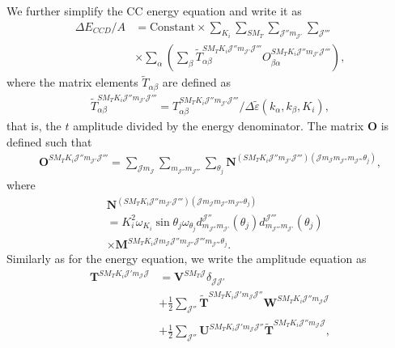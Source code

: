 \documentclass[a4paper,12pt]{report}
\begin{document}
We further simplify the CC energy equation and write it
as
\begin{align} \label{eq:cc_ene_impl2}
  \Delta E_{CCD}/A &= \text{Constant} \times \sum_{K_{i}}
  \sum_{SM_{T}}\sum_{\mathcal{J}''m_{\mathcal{J}'}}
  \sum_{\mathcal{J}'''} \nonumber \\
  & \times \sum_{\alpha } \left( 
  \sum_{\beta }\tilde{T}_{\alpha \beta }^{SM_{T}K_{i}\mathcal{J}''m_{\mathcal{J}'}
    \mathcal{J}'''}O_{\beta \alpha }^{SM_{T}K_{i}\mathcal{J}''
    m_{\mathcal{J}'}\mathcal{J}'''}
  \right),
\end{align}
where the matrix elements $\tilde{T}_{\alpha \beta }$ are defined as
\begin{align}
  \tilde{T}_{\alpha \beta }^{SM_{T}K_{i}\mathcal{J}''m_{\mathcal{J}'}
    \mathcal{J}'''} = T_{\alpha \beta }^{SM_{T}K_{i}
    \mathcal{J}''m_{\mathcal{J}'}\mathcal{J}'''}
  /\Delta \tilde{\varepsilon}(k_{\alpha }, k_{\beta }, K_{i}),
\end{align} 
that is, the $t$ amplitude divided by the energy denominator.
The matrix $\mathbf{O}$ is defined such that
\begin{align}
  \mathbf{O}^{SM_{T}K_{i}\mathcal{J}''m_{\mathcal{J}'}\mathcal{J}'''} 
  = \sum_{\mathcal{J}m_{\mathcal{J}}}\sum_{m_{\mathcal{J}''}m_{\mathcal{J}'''}}
  \sum_{\theta_{j}}\mathbf{N}^{(SM_{T}K_{i}\mathcal{J}''m_{\mathcal{J}'}
    \mathcal{J}''')(\mathcal{J}m_{\mathcal{J}}m_{\mathcal{J}''}
    m_{\mathcal{J}'''}\theta_{j})},
\end{align}
where
\begin{align}
  & \mathbf{N}^{(SM_{T}K_{i}\mathcal{J}''m_{\mathcal{J}'}
    \mathcal{J}''')(\mathcal{J}m_{\mathcal{J}}m_{\mathcal{J}''}
    m_{\mathcal{J}'''}\theta_{j})} \nonumber \\
  & = K_{i}^{2}\omega_{K_{i}}\sin \theta_{j}\omega_{\theta_{j}} 
  d_{m_{\mathcal{J}''}m_{\mathcal{J}'}}^{\mathcal{J}''}(\theta_{j})
  d_{m_{\mathcal{J}'''}m_{\mathcal{J}'}}^{\mathcal{J}'''}(\theta_{j}) 
  \nonumber \\
  & \times \mathbf{M}^{SM_{T}K_{i}\mathcal{J}m_{\mathcal{J}}
    \mathcal{J}''m_{\mathcal{J}''}\mathcal{J}'''
    m_{\mathcal{J}'''}\theta_{j}}. 
\end{align}
Similarly as for the energy equation, we write the 
amplitude equation as
\begin{align} \label{eq:tampl_impl1}
  \mathbf{T}^{SM_{T}K_{i}\mathcal{J}'m_{\mathcal{J}}\mathcal{J}} 
  & = \mathbf{V}^{SM_{T}\mathcal{J}}\delta_{\mathcal{J}\mathcal{J}'}
  \nonumber \\
  & + \frac{1}{2}\sum_{\mathcal{J}''}
  \mathbf{\tilde{T}}^{SM_{T}K_{i}\mathcal{J}'m_{\mathcal{J}}\mathcal{J}''}
  \mathbf{W}^{SM_{T}K_{i}\mathcal{J}''m_{\mathcal{J}}\mathcal{J}}
  \nonumber \\
  & + \frac{1}{2}\sum_{\mathcal{J}''}
  \mathbf{U}^{SM_{T}K_{i}\mathcal{J}'m_{\mathcal{J}}\mathcal{J}''}
  \mathbf{\tilde{T}}^{SM_{T}K_{i}\mathcal{J}''m_{\mathcal{J}}\mathcal{J}},
\end{align}
\end{document}
